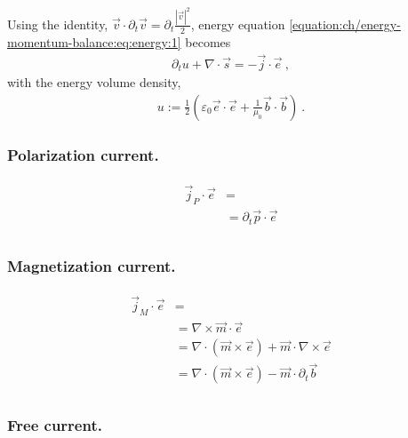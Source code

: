 \documentclass[letterpaper,10pt,english]{jupyterBook}
\begin{document}
Using the identity, \(\vec{v} \cdot \partial_t \vec{v} = \partial_t \frac{|\vec{v}|^2}{2}\), energy equation \eqref{equation:ch/energy-momentum-balance:eq:energy:1} becomes
\begin{equation}\label{equation:ch/energy-momentum-balance:eq:energy:2}
\begin{split}\partial_t u + \nabla \cdot \vec{s} = - \vec{j} \cdot \vec{e} \ ,\end{split}
\end{equation}
\sphinxAtStartPar
with the energy volume density,
\begin{equation}\label{equation:ch/energy-momentum-balance:eq:energy:density}
\begin{split} u := \frac{1}{2} \left( \varepsilon_0 \vec{e} \cdot \vec{e} + \frac{1}{\mu_0} \vec{b} \cdot \vec{b} \right) \ .\end{split}
\end{equation}\subsubsection*{Polarization current.}
\begin{equation*}
\begin{split}\begin{aligned}
  \vec{j}_P \cdot \vec{e} & = \\
  & = \partial_t \vec{p} \cdot \vec{e} \\
\end{aligned}\end{split}
\end{equation*}\subsubsection*{Magnetization current.}
\begin{equation*}
\begin{split}\begin{aligned}
  \vec{j}_M \cdot \vec{e} & = \\
  & = \nabla \times \vec{m} \cdot \vec{e} \\
  & = \nabla \cdot \left( \vec{m} \times \vec{e} \right) + \vec{m} \cdot \nabla \times \vec{e} \\
  & = \nabla \cdot \left( \vec{m} \times \vec{e} \right) - \vec{m} \cdot \partial_t \vec{b} \\
\end{aligned}\end{split}
\end{equation*}\subsubsection*{Free current.}
\end{document}
